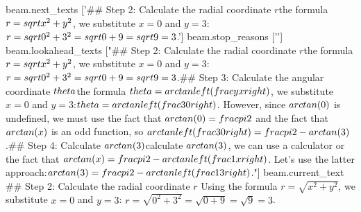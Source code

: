 beam.next_texts
['## Step 2: Calculate the radial coordinate $r$\nUsing the formula $r = \\sqrt{x^2 + y^2}$, we substitute $x = 0$ and $y = 3$:\n$r = \\sqrt{0^2 + 3^2} = \\sqrt{0 + 9} = \\sqrt{9} = 3$.\n\n']
beam.stop_reasons
['\n\n']
beam.lookahead_texts
["## Step 2: Calculate the radial coordinate $r$\nUsing the formula $r = \\sqrt{x^2 + y^2}$, we substitute $x = 0$ and $y = 3$:\n$r = \\sqrt{0^2 + 3^2} = \\sqrt{0 + 9} = \\sqrt{9} = 3$.\n\n## Step 3: Calculate the angular coordinate $\\theta$\nUsing the formula $\\theta = \\arctan\\left(\\frac{y}{x}\\right)$, we substitute $x = 0$ and $y = 3$:\n$\\theta = \\arctan\\left(\\frac{3}{0}\\right)$. However, since $\\arctan(0)$ is undefined, we must use the fact that $\\arctan(0) = \\frac{\\pi}{2}$ and the fact that $\\arctan(x)$ is an odd function, so $\\arctan\\left(\\frac{3}{0}\\right) = \\frac{\\pi}{2} - \\arctan(3)$.\n\n## Step 4: Calculate $\\arctan(3)$\nTo calculate $\\arctan(3)$, we can use a calculator or the fact that $\\arctan(x) = \\frac{\\pi}{2} - \\arctan\\left(\\frac{1}{x}\\right)$. Let's use the latter approach:\n$\\arctan(3) = \\frac{\\pi}{2} - \\arctan\\left(\\frac{1}{3}\\right)$.\n\n"]
beam.current_text
## Step 2: Calculate the radial coordinate $r$
Using the formula $r = \sqrt{x^2 + y^2}$, we substitute $x = 0$ and $y = 3$:
$r = \sqrt{0^2 + 3^2} = \sqrt{0 + 9} = \sqrt{9} = 3$.


